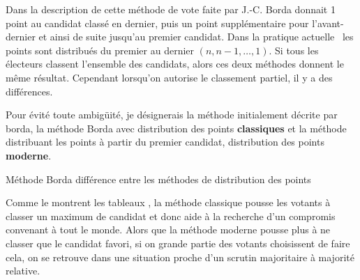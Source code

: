 \documentclass[../report]{subfiles}
\begin{document}
  Dans la description de cette méthode de vote faite par J.-C. Borda donnait 1 point au
  candidat classé en dernier, puis un point supplémentaire pour l'avant-dernier et ainsi
  de suite jusqu'au premier candidat.
  Dans la pratique actuelle~\cite{emerson_original_2013} les points sont distribués du 
  premier au dernier $(n, n-1, …, 1)$.
  Si tous les électeurs classent l'ensemble des candidats, alors ces deux méthodes donnent le même 
  résultat. Cependant lorsqu'on autorise le classement partiel, il y a des différences.

  Pour évité toute ambigüité, je désignerais la méthode initialement décrite par borda, 
  la méthode Borda avec distribution des points \textbf{classiques} et la méthode distribuant
  les points à partir du premier candidat, distribution des points \textbf{moderne}.

  \begin{table}
    \begin{center}
      \caption{Méthode Borda différence entre les méthodes de distribution des points}%
      \label{fig:diff:borda:caslim2}
    \end{center}
  \end{table}

  Comme le montrent les tableaux , la méthode classique pousse 
  les votants à classer un maximum de candidat et donc aide à la recherche d'un 
  compromis convenant à tout le monde.
  Alors que la méthode moderne pousse plus à ne classer que le candidat favori, si on grande
  partie des votants choisissent de faire cela, on se retrouve dans une situation proche 
  d'un scrutin majoritaire à majorité relative.
\end{document}
